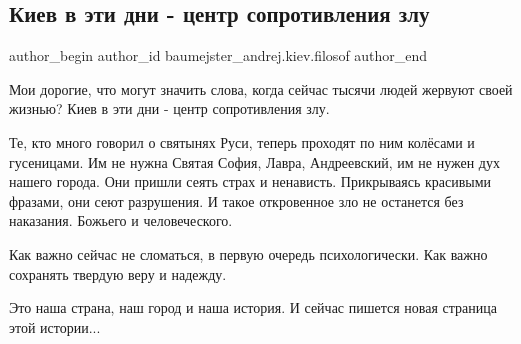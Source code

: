  
 
 
 
 
 
\subsection{Киев в эти дни - центр сопротивления злу}
\label{sec:25_02_2022.fb.baumejster_andrej.kiev.filosof.1.kiev_centr_soprotivlenia_zlu}
 
\ifcmt
 author_begin
   author_id baumejster_andrej.kiev.filosof
 author_end
\fi

Мои дорогие, что могут значить слова, когда сейчас тысячи людей жервуют своей
жизнью? Киев в эти дни - центр сопротивления злу.

Те, кто много говорил о святынях Руси, теперь проходят по ним колёсами и
гусеницами. Им не нужна Святая София, Лавра, Андреевский, им не нужен дух
нашего города. Они пришли сеять страх и ненависть. Прикрываясь красивыми
фразами, они сеют разрушения. И такое откровенное зло не останется без
наказания. Божьего и человеческого.

Как важно сейчас не сломаться, в первую очередь психологически. Как важно
сохранять твердую веру и надежду.

Это наша страна, наш город и наша история. И сейчас пишется новая страница этой
истории...

